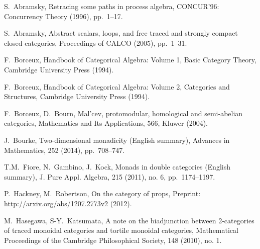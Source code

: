 \documentclass[11pt,oneside,article]{memoir}
\begin{document}
\begin{thebibliography}{XXX}

 S.~Abramsky, Retracing some paths in process algebra, CONCUR'96: Concurrency Theory (1996), pp.~1--17.

 S.~Abramsky, Abstract scalars, loops, and free traced and strongly compact closed categories, Proceedings of CALCO (2005), pp.~1--31.




 F.~Borceux, Handbook of Categorical Algebra: Volume 1, Basic Category Theory, Cambridge University Press (1994).

 F.~Borceux, Handbook of Categorical Algebra: Volume 2, Categories and Structures, Cambridge University Press (1994).

 F.~Borceux, D.~Bourn, Mal'cev, protomodular, homological and semi-abelian categories, Mathematics
 and Its Applications, 566, Kluwer (2004).

 J.~Bourke, Two-dimensional monadicity (English summary), Advances in Mathematics, 252 (2014), pp.~708--747.

 T.M.~Fiore, N.~Gambino, J.~Kock, Monads in double categories (English summary), J. Pure Appl. Algebra, 215 (2011), no. 6, pp.~1174--1197.


 P.~Hackney, M.~Robertson, On the category of props, Preprint: \url{http://arxiv.org/abs/1207.2773v2} (2012).

M.~Hasegawa, S-Y.~Katsumata, A note on the biadjunction between 2-categories of traced monoidal categories and tortile monoidal categories, Mathematical Proceedings of the Cambridge Philosophical Society, 148 (2010), no. 1.


\end{thebibliography}
\end{document}
